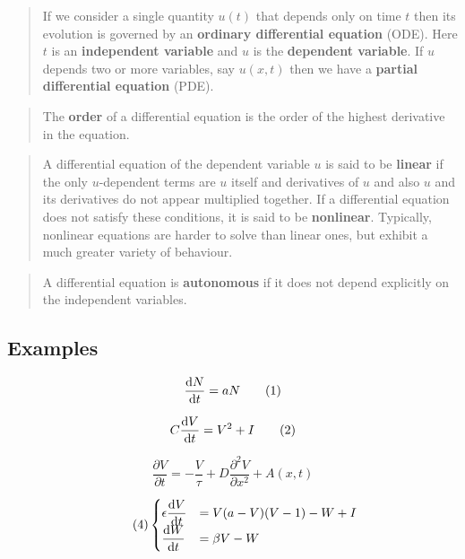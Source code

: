 \documentclass[11pt]{article}
\begin{document}
\begin{quote}
If we consider a single quantity \(u(t)\) that depends only on time
\(t\) then its evolution is governed by an \textbf{ordinary differential
equation} (ODE). Here \(t\) is an \textbf{independent variable} and
\(u\) is the \textbf{dependent variable}. If \(u\) depends two or more
variables, say \(u(x,t)\) then we have a \textbf{partial differential
equation} (PDE).
\end{quote}

\begin{quote}
The \textbf{order} of a differential equation is the order of the
highest derivative in the equation.
\end{quote}

\begin{quote}
A differential equation of the dependent variable \(u\) is said to be
\textbf{linear} if the only \(u\)-dependent terms are \(u\) itself and
derivatives of \(u\) and also \(u\) and its derivatives do not appear
multiplied together. If a differential equation does not satisfy these
conditions, it is said to be \textbf{nonlinear}. Typically, nonlinear
equations are harder to solve than linear ones, but exhibit a much
greater variety of behaviour.
\end{quote}

\begin{quote}
A differential equation is \textbf{autonomous} if it does not depend
explicitly on the independent variables.
\end{quote}

\hypertarget{examples}{%
\subsection{Examples}\label{examples}}

\[\frac{{\rm d}N}{{\rm d}t}= aN \tag{1}\]

\[C\frac{{\rm d}V}{{\rm d}t}= V^2 +I \tag{2}\]

\[\frac{\partial V}{\partial t} = -\frac{V}{\tau} + D \frac{\partial^2 V}{\partial x^2} + A(x,t)\tag{3}\]

\begin{equation*} \tag{4}
\begin{cases}
\epsilon \displaystyle{\frac{{\rm d}V}{{\rm d}t}} &= V(a-V)(V-1) - W + I\\
\displaystyle{\frac{{\rm d}W}{{\rm d}t}} &=\beta V-W
\end{cases}
\end{equation*}
\end{document}
